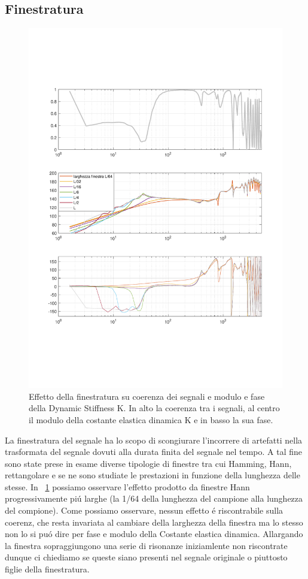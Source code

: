 \documentclass[12pt,a4paper]{article}
\begin{document}
\subsection{Finestratura}

\begin{figure}
	\centering
	\includegraphics[width=16cm]{effettofinestra}
	\caption{Effetto della finestratura su coerenza dei segnali e modulo e fase della Dynamic Stiffness K. In alto la coerenza tra i segnali, al centro il modulo della costante elastica dinamica K e in basso la sua fase.}
	\label{fig:effettofinestra}
\end{figure}

La finestratura del segnale ha lo scopo di scongiurare l'incorrere di artefatti nella trasformata del segnale dovuti alla durata finita del segnale nel tempo. A tal fine sono state prese in esame diverse tipologie di finestre tra cui Hamming, Hann, rettangolare e se ne sono studiate le prestazioni in funzione della lunghezza delle stesse. In \figurename~\ref{fig:effettofinestra} possiamo osservare l'effetto prodotto da finestre Hann progressivamente pi\'u larghe (la 1/64 della lunghezza del campione alla lunghezza del compione). Come possiamo osservare, nessun effetto \'e riscontrabile sulla coerenz, che resta invariata al cambiare della larghezza della finestra ma lo stesso non lo si pu\'o dire per fase e modulo della Costante elastica dinamica. Allargando la finestra sopraggiungono una serie di risonanze iniziamlente non riscontrate dunque ci chiediamo se queste siano presenti nel segnale originale o piuttosto figlie della finestratura.
\end{document}
